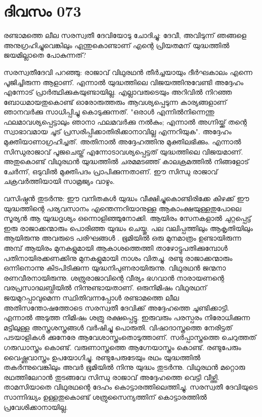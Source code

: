 \newpage
\section{ദിവസം 073}


രണ്ടാമത്തെ ലീല സരസ്വതീ ദേവിയോടു ചോദിച്ചു: ദേവീ, അവിടുന്ന് ഞങ്ങളെ അനുഗ്രഹിച്ചുവെങ്കിലും എന്തുകൊണ്ടാണ്‌ എന്റെ പ്രിയതമന്‌ യുദ്ധത്തില്‍ ജയമില്ലാതെ പോകുന്നത്‌? 

സരസ്വതീദേവി പറഞ്ഞു: രാജാവ്‌ വിഥുരഥന്‍ തീര്‍ച്ചയായും ദീര്‍ഘകാലം എന്നെ പൂജിച്ചിരുന്ന ആളാണ്‌. എന്നാല്‍ യുദ്ധത്തിലെ വിജയത്തിനുവേണ്ടി അദ്ദേഹം എന്നോട്‌ പ്രാര്‍ത്ഥിക്കുകയുണ്ടായില്ല. എല്ലാവരുടെയും അറിവില്‍ നിറഞ്ഞ ബോധമായതുകൊണ്ട്‌ ഓരോരുത്തരും ആവശ്യപ്പെടുന്ന കാര്യങ്ങളാണ്‌ ഞാനവര്‍ക്കു സാധിപ്പിച്ചു കൊടുക്കുന്നത്‌. "ഒരാള്‍ എന്നില്‍നിന്നെന്തു ഫലമാവശ്യപ്പെട്ടാലും ഞാനാ ഫലമവര്‍ക്കു നല്‍കും; എന്നാല്‍ അഗ്നിയ്ക്ക്‌ തന്റെ സ്വാഭാവമായ ചൂട്‌ പ്രസരിപ്പിക്കാതിരിക്കാനാവില്ല എന്നറിയുക". അദ്ദേഹം മുക്തിയാണാഗ്രഹിച്ചത്‌. അതിനാല്‍ അദ്ദേഹത്തിനു മുക്തിലഭിക്കും. എന്നാല്‍ സിന്ധുരാജാവ്‌ പൂജചെയ്ത്‌ എന്നോടാവശ്യപ്പെട്ടത്‌ യുദ്ധത്തിലെ വിജയമാണ്‌. അതുകൊണ്ട്‌ വിഥുരഥന്‍ യുദ്ധത്തില്‍ ചരമമടഞ്ഞ്‌ കാലക്രമത്തില്‍ നിങ്ങളോട്‌ ചേര്‍ന്ന്, ഒടുവില്‍ മുക്തിപദം പ്രാപിക്കുന്നതാണ്‌. ഈ സിന്ധു രാജാവ്‌ ചക്രവര്‍ത്തിയായി സാമ്രജ്യം വാഴും.

വസിഷ്ഠന്‍ തുടര്‍ന്നു: ഈ വനിതകള്‍ യുദ്ധം വീക്ഷിച്ചുകൊണ്ടിരിക്കേ കിഴക്ക്‌ ഈ യുദ്ധത്തിന്റെ പര്യവസാനം എന്തെന്നറിയാനുള്ള ആകാംക്ഷയുള്ളതുപോലെ സൂര്യന്‍ ആ യുദ്ധദൃശ്യം ഒന്നൊളിഞ്ഞുനോക്കി. ആയിരം സേനകളാല്‍ ചുറ്റപ്പെട്ട്‌ ഇരു രാജാക്കന്മാരും പൊരിഞ്ഞ യുദ്ധം ചെയ്തു. പല വലിപ്പത്തിലും ആകൃതിയിലും ആയിരുന്നു അവരുടെ പരിഘങ്ങള്‍ . ഭൂമിയില്‍ ഒരു മുനമാത്രം ഉണ്ടായിരുന്ന അമ്പ്‌ ആയിരം മുനകളുമായി ആകാശത്തെത്തി താഴോട്ടുപതിക്കുമ്പോള്‍ പതിനായിരക്കണക്കിനു മുനകളുമായി നാശം വിതച്ചു. രണ്ടു രാജാക്കന്മാരും ഒന്നിനൊന്നു കിടപിടിക്കുന്ന യുദ്ധനിപുണരായിരുന്നു. വിഥുരഥന്‍ ജന്മനാ രണവീരനായിരുന്നു. ശത്രുരാജാവിന്റെ വീര്യം ഭഗവാന്‍ നാരായണന്റെ വരപ്രസാദലബ്ധിയില്‍ നിന്നുണ്ടായതാണ്‌. ഒരുനിമിഷം വിഥുരഥന്‌ ജയമുറപ്പാവുമെന്ന സ്ഥിതിവന്നപ്പോള്‍ രണ്ടാമത്തെ ലീല അതിസന്തോഷത്തോടെ സരസ്വതീ ദേവിക്ക്‌ അദ്ദേഹത്തെ ചൂണ്ടിക്കാട്ടി. എന്നാല്‍ അടുത്ത നിമിഷം ശത്രു രക്ഷപ്പെട്ടു. ഇരുവരും പരസ്പരം നിരോധിക്കുന്ന മട്ടിലുള്ള അസ്ത്രശസ്ത്രങ്ങള്‍ വര്‍ഷിച്ചു പൊരുതി. വിഷാദാസ്ത്രത്തെ നേരിട്ടത്‌ പടയാളികള്‍ ക്കുനേരേ ആവേശാസ്ത്രംതൊടുത്താണ്‌. സര്‍പ്പാസ്ത്രത്തെ ചെറുത്തത്‌ ഗരുഡാസ്ത്രം കൊണ്ട്‌. വരുണാസ്ത്രത്തെ ആഗ്നേയാസ്ത്രം കൊണ്ട്‌. രണ്ടുപേരും വൈഷ്ണവാസ്ത്രം ഉപയോഗിച്ചു. രണ്ടുപേരുടേയും രഥം യുദ്ധത്തില്‍ തകര്‍ന്നുവെങ്കിലും അവര്‍ ഭൂമിയില്‍ നിന്നു യുദ്ധം തുടര്‍ന്നു. വിഥുരഥന്‍ മറ്റൊരു രഥത്തിലേറാന്‍ തുടങ്ങവേ സിന്ധു രാജാവ്‌ അദ്ദേഹത്തെ വെട്ടി വീഴ്ത്തി. താമസിയാതെ വിഥുരഥന്റെ ദേഹം കൊട്ടാരത്തിലെത്തിച്ചു. സരസ്വതീ ദേവിയുടെ സാന്നിദ്ധ്യം ഉള്ളതുകൊണ്ട്‌ ശത്രുസൈന്യത്തിന്‌ കൊട്ടാരത്തില്‍ പ്രവേശിക്കാനായില്ല.

